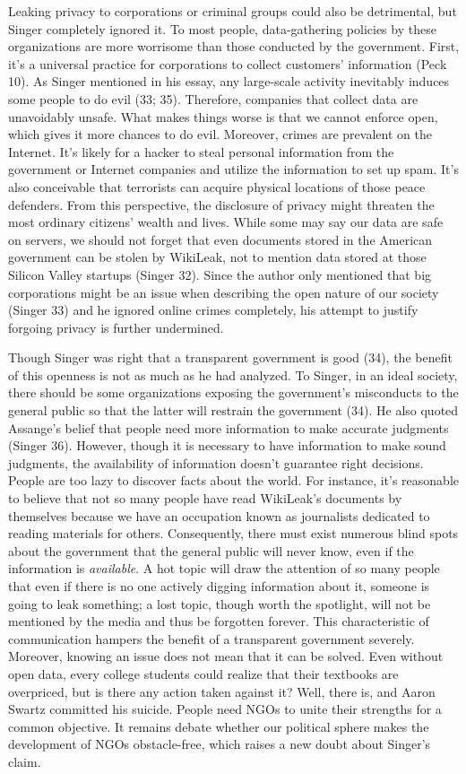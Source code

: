 \documentclass{writing}
\begin{document}
Leaking privacy to corporations or criminal groups could also be
detrimental, but Singer completely ignored it. To most people,
data-gathering policies by these organizations are more worrisome than
those conducted by the government. First, it's a universal practice for
corporations to collect customers' information (Peck 10). As Singer
mentioned in his essay, any large-scale activity inevitably induces some
people to do evil (33; 35). Therefore, companies that collect data are
unavoidably unsafe. What makes things worse is that we cannot enforce
open, which gives it more chances to do evil. Moreover, crimes are
prevalent on the Internet. It's likely for a hacker to steal personal
information from the government or Internet companies and utilize the
information to set up spam. It's also conceivable that terrorists can
acquire physical locations of those peace defenders. From this
perspective, the disclosure of privacy might threaten the most ordinary
citizens' wealth and lives. While some may say our data are safe on
servers, we should not forget that even documents stored in the American
government can be stolen by WikiLeak, not to mention data stored at
those Silicon Valley startups (Singer 32). Since the author only
mentioned that big corporations might be an issue when describing the
open nature of our society (Singer 33) and he ignored online crimes
completely, his attempt to justify forgoing privacy is further
undermined.

Though Singer was right that a transparent government is good (34), the
benefit of this openness is not as much as he had analyzed. To Singer,
in an ideal society, there should be some organizations exposing the
government's misconducts to the general public so that the latter will
restrain the government (34). He also quoted Assange's belief that
people need more information to make accurate judgments (Singer 36).
However, though it is necessary to have information to make sound
judgments, the availability of information doesn't guarantee right
decisions. People are too lazy to discover facts about the world. For
instance, it's reasonable to believe that not so many people have read
WikiLeak's documents by themselves because we have an occupation known
as journalists dedicated to reading materials for others. Consequently,
there must exist numerous blind spots about the government that the
general public will never know, even if the information is
\emph{available}. A hot topic will draw the attention of so many people
that even if there is no one actively digging information about it,
someone is going to leak something; a lost topic, though worth the
spotlight, will not be mentioned by the media and thus be forgotten
forever. This characteristic of communication hampers the benefit of a
transparent government severely. Moreover, knowing an issue does not
mean that it can be solved. Even without open data, every college
students could realize that their textbooks are overpriced, but is there
any action taken against it? Well, there is, and Aaron Swartz committed
his suicide. People need NGOs to unite their strengths for a common
objective. It remains debate whether our political sphere makes the
development of NGOs obstacle-free, which raises a new doubt about
Singer's claim.
\end{document}
